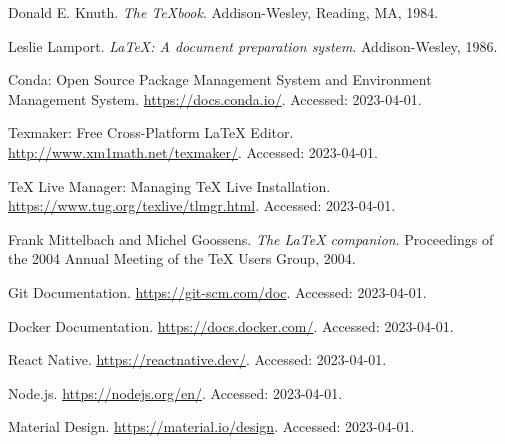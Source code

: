 \newpage
\begin{thebibliography}{9}

Donald E. Knuth.
\textit{The TeXbook}.
Addison-Wesley, Reading, MA, 1984.

Leslie Lamport.
\textit{\LaTeX: A document preparation system}.
Addison-Wesley, 1986.

Conda: Open Source Package Management System and Environment Management System.
\url{https://docs.conda.io/}.
Accessed: 2023-04-01.

Texmaker: Free Cross-Platform LaTeX Editor.
\url{http://www.xm1math.net/texmaker/}.
Accessed: 2023-04-01.

TeX Live Manager: Managing TeX Live Installation.
\url{https://www.tug.org/texlive/tlmgr.html}.
Accessed: 2023-04-01.

Frank Mittelbach and Michel Goossens.
\textit{The LaTeX companion}.
Proceedings of the 2004 Annual Meeting of the TeX Users Group, 2004.

Git Documentation.
\url{https://git-scm.com/doc}.
Accessed: 2023-04-01.

Docker Documentation.
\url{https://docs.docker.com/}.
Accessed: 2023-04-01.

React Native.
\url{https://reactnative.dev/}.
Accessed: 2023-04-01.

Node.js.
\url{https://nodejs.org/en/}.
Accessed: 2023-04-01.

Material Design.
\url{https://material.io/design}.
Accessed: 2023-04-01.

\end{thebibliography}



 \documentclass{article}
